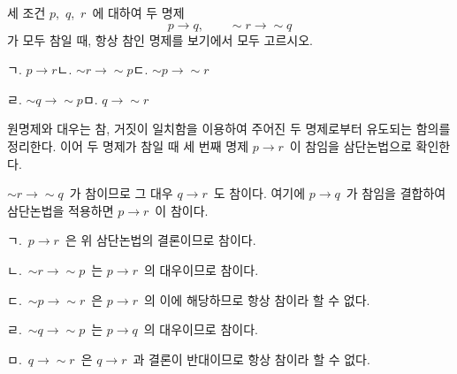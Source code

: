\documentclass[10pt]{article}
\begin{document}
\newpage


\begin{dmproblem}
세 조건 $p$,\ $q$,\ $r$\ 에 대하여 두 명제
\begin{equation*}
  p \to q, \qquad \sim r \to \sim q
\end{equation*}
가 모두 참일 때, 항상 참인 명제를 보기에서 모두 고르시오.

\vspace{1mm}
\begin{dmoptionbox}
ㄱ. $p \to r$\qquad ㄴ. $\sim r \to \sim p$\qquad ㄷ. $\sim p \to \sim r$

\vspace{0.6mm}
ㄹ. $\sim q \to \sim p$\qquad ㅁ. $q \to \sim r$
\end{dmoptionbox}
\end{dmproblem}

\begin{dmapproach}
원명제와 대우는 참, 거짓이 일치함을 이용하여 주어진 두 명제로부터 유도되는 함의를 정리한다. 이어 두 명제가 참일 때 세 번째 명제 $p \to r$\ 이 참임을 삼단논법으로 확인한다.
\end{dmapproach}

\begin{dmsolution}
$\sim r \to \sim q$\ 가 참이므로 그 대우 $q \to r$\ 도 참이다. 여기에 $p \to q$\ 가 참임을 결합하여 삼단논법을 적용하면 $p \to r$\ 이 참이다.

ㄱ.\ $p \to r$\ 은 위 삼단논법의 결론이므로 참이다.

ㄴ.\ $\sim r \to \sim p$\ 는 $p \to r$\ 의 대우이므로 참이다.

ㄷ.\ $\sim p \to \sim r$\ 은 $p \to r$\ 의 이에 해당하므로 항상 참이라 할 수 없다.

ㄹ.\ $\sim q \to \sim p$\ 는 $p \to q$\ 의 대우이므로 참이다.

ㅁ.\ $q \to \sim r$\ 은 $q \to r$\ 과 결론이 반대이므로 항상 참이라 할 수 없다.
\end{dmsolution}

\dmchecktitle

\end{document}
